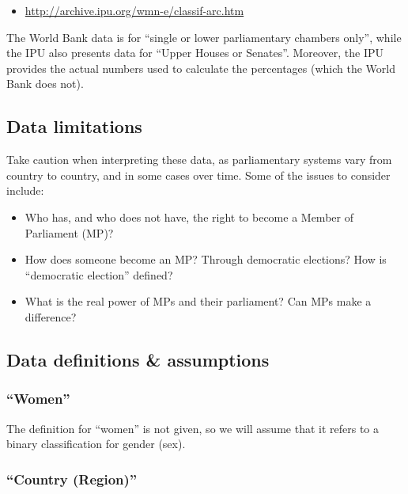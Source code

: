 \documentclass[a4paper,9pt,twocolumn,twoside,]{pinp}
\providecommand{\tightlist}{%
  \setlength{\itemsep}{0pt}\setlength{\parskip}{0pt}}
\begin{document}
\begin{itemize}
\tightlist
\item
  \url{http://archive.ipu.org/wmn-e/classif-arc.htm}
\end{itemize}

The World Bank data is for ``single or lower parliamentary chambers
only'', while the IPU also presents data for ``Upper Houses or
Senates''. Moreover, the IPU provides the actual numbers used to
calculate the percentages (which the World Bank does not).

\hypertarget{data-limitations}{%
\subsection{Data limitations}\label{data-limitations}}

Take caution when interpreting these data, as parliamentary systems vary
from country to country, and in some cases over time. Some of the issues
to consider include:

\begin{itemize}
\tightlist
\item
  Who has, and who does not have, the right to become a Member of
  Parliament (MP)?
\item
  How does someone become an MP? Through democratic elections? How is
  ``democratic election'' defined?
\item
  What is the real power of MPs and their parliament? Can MPs make a
  difference?
\end{itemize}

\hypertarget{data-definitions-assumptions}{%
\subsection{Data definitions \&
assumptions}\label{data-definitions-assumptions}}

\hypertarget{women}{%
\subsubsection{``Women''}\label{women}}

The definition for ``women'' is not given, so we will assume that it
refers to a binary classification for gender (sex).

\hypertarget{country-region}{%
\subsubsection{``Country (Region)''}\label{country-region}}
\end{document}

